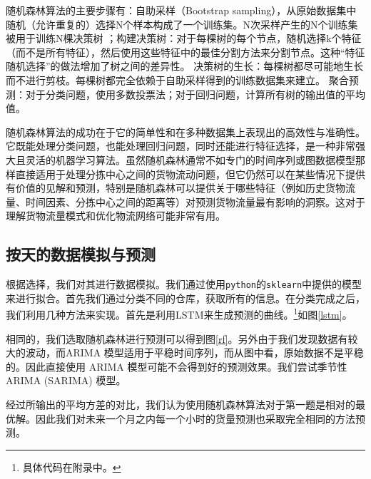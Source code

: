 \documentclass[UTF8]{article}%
\begin{document}
随机森林算法的主要步骤有：自助采样（Bootstrap sampling），从原始数据集中随机（允许重复的）选择N个样本构成了一个训练集。N次采样产生的N个训练集被用于训练N棵决策树
；构建决策树：对于每棵树的每个节点，随机选择k个特征（而不是所有特征），然后使用这些特征中的最佳分割方法来分割节点。这种“特征随机选择”的做法增加了树之间的差异性。
决策树的生长：每棵树都尽可能地生长而不进行剪枝。每棵树都完全依赖于自助采样得到的训练数据集来建立。
聚合预测：对于分类问题，使用多数投票法；对于回归问题，计算所有树的输出值的平均值。

随机森林算法的成功在于它的简单性和在多种数据集上表现出的高效性与准确性。它既能处理分类问题，也能处理回归问题，同时还能进行特征选择，是一种非常强大且灵活的机器学习算法。虽然随机森林通常不如专门的时间序列或图数据模型那样直接适用于处理分拣中心之间的货物流动问题，但它仍然可以在某些情况下提供有价值的见解和预测，特别是随机森林可以提供关于哪些特征（例如历史货物流量、时间因素、分拣中心之间的距离等）对预测货物流量最有影响的洞察。这对于理解货物流量模式和优化物流网络可能非常有用。


\subsection{按天的数据模拟与预测}
根据选择，我们对其进行数据模拟。我们通过使用{\tt python}的{\tt sklearn}中提供的模型来进行拟合。首先我们通过分类不同的仓库，获取所有的信息。在分类完成之后，我们利用几种方法来实现。首先是利用LSTM来生成预测的曲线。\footnote{具体代码在附录中。}如图\ref{lstm}。

相同的，我们选取随机森林进行预测可以得到图\ref{rf}。另外由于我们发现数据有较大的波动，而ARIMA 模型适用于平稳时间序列，而从图中看，原始数据不是平稳的。因此直接使用 ARIMA 模型可能不会得到好的预测效果。我们尝试季节性 ARIMA (SARIMA) 模型。

经过所输出的平均方差的对比，我们认为使用随机森林算法对于第一题是相对的最优解。因此我们对未来一个月之内每一个小时的货量预测也采取完全相同的方法预测。
\end{document}
